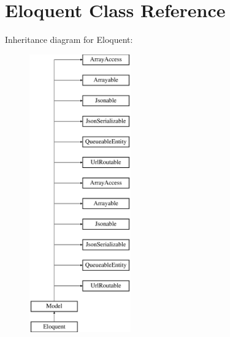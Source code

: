 \section{Eloquent Class Reference}
\label{class_eloquent}
Inheritance diagram for Eloquent\+:\begin{figure}[H]
\begin{center}
\leavevmode
\includegraphics[height=12.000000cm]{class_eloquent}
\end{center}
\end{figure}

